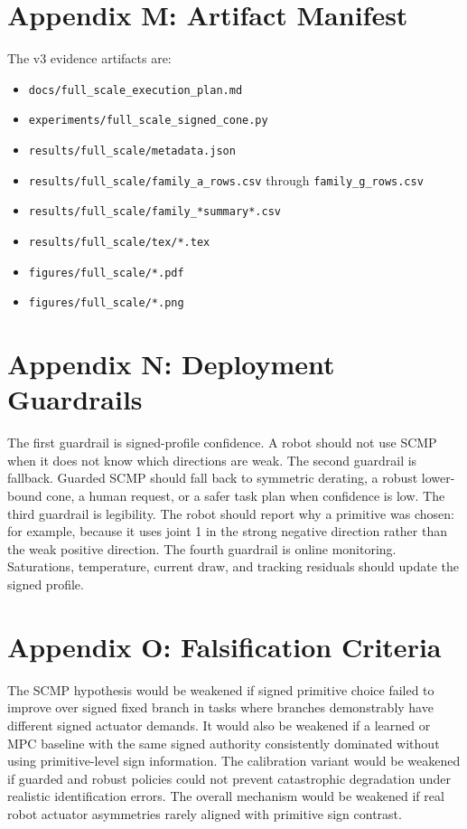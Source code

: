 \documentclass{article}
\begin{document}
\section{Appendix M: Artifact Manifest}

The v3 evidence artifacts are:
\begin{itemize}
\item \texttt{docs/full\_scale\_execution\_plan.md}
\item \texttt{experiments/full\_scale\_signed\_cone.py}
\item \texttt{results/full\_scale/metadata.json}
\item \texttt{results/full\_scale/family\_a\_rows.csv} through \texttt{family\_g\_rows.csv}
\item \texttt{results/full\_scale/family\_*summary*.csv}
\item \texttt{results/full\_scale/tex/*.tex}
\item \texttt{figures/full\_scale/*.pdf}
\item \texttt{figures/full\_scale/*.png}
\end{itemize}

\section{Appendix N: Deployment Guardrails}

The first guardrail is signed-profile confidence. A robot should not use SCMP when it does not know which directions are weak. The second guardrail is fallback. Guarded SCMP should fall back to symmetric derating, a robust lower-bound cone, a human request, or a safer task plan when confidence is low. The third guardrail is legibility. The robot should report why a primitive was chosen: for example, because it uses joint 1 in the strong negative direction rather than the weak positive direction. The fourth guardrail is online monitoring. Saturations, temperature, current draw, and tracking residuals should update the signed profile.

\section{Appendix O: Falsification Criteria}

The SCMP hypothesis would be weakened if signed primitive choice failed to improve over signed fixed branch in tasks where branches demonstrably have different signed actuator demands. It would also be weakened if a learned or MPC baseline with the same signed authority consistently dominated without using primitive-level sign information. The calibration variant would be weakened if guarded and robust policies could not prevent catastrophic degradation under realistic identification errors. The overall mechanism would be weakened if real robot actuator asymmetries rarely aligned with primitive sign contrast.
\end{document}
